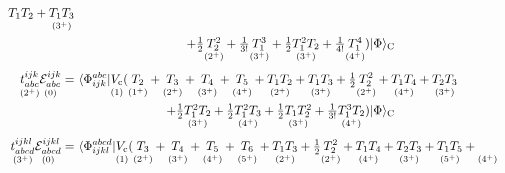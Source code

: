 \documentclass[11pt]{article}
\numberwithin{equation}{section}
\begin{document}
\begin{rmk}
\begin{align}
{      T_1T_2
    }
    +
    \underset{(3^{+})}{\vphantom{(}
      T_1T_3
    }
\\
\label{eq:cc-doubles-equation}
&
\makebox[0.75\linewidth][r]{\ensuremath{
    +
      \tfr{1}{2}
    \underset{(2^{+})}{\vphantom{(}
      T_2^2
    }
    +
      \tfr{1}{3!}
    \underset{(3^{+})}{\vphantom{(}
      T_1^3
    }
    +
      \tfr{1}{2}
    \underset{(3^{+})}{\vphantom{(}
      T_1^2T_2
    }
    +
      \tfr{1}{4!}
    \underset{(4^{+})}{\vphantom{(}
      T_1^4
    }
    )
  \kt{\F}_\mr{C}
}}
\\[3pt]
\nonumber
  \underset{(2^+)}{\vphantom{(}
  t_{abc}^{ijk}
  }
  \underset{(0)}{\vphantom{(}
  \mc{E}_{abc}^{ijk}
  }
=&\
  \br{\F_{ijk}^{abc}}
  \underset{(1)}{\vphantom{(}
    V_\mr{c}
  }
    (
    \underset{(1^{+})}{\vphantom{(}
      T_2
    }
    +
    \underset{(2^{+})}{\vphantom{(}
      T_3
    }
    +
    \underset{(3^{+})}{\vphantom{(}
      T_4
    }
    +
    \underset{(4^{+})}{\vphantom{(}
      T_5
    }
    +
    \underset{(2^{+})}{\vphantom{(}
      T_1T_2
    }
    +
    \underset{(3^{+})}{\vphantom{(}
      T_1T_3
    }
    +
      \tfr{1}{2}
    \underset{(2^{+})}{\vphantom{(}
      T_2^2
    }
    +
    \underset{(4^{+})}{\vphantom{(}
      T_1T_4
    }
    +
    \underset{(3^{+})}{\vphantom{(}
      T_2T_3
    }
\\
\label{eq:cc-triples-equation}
&
\makebox[0.75\linewidth][r]{\ensuremath{
    +
      \tfr{1}{2}
    \underset{(3^{+})}{\vphantom{(}
      T_1^2T_2
    }
    +
      \tfr{1}{2}
    \underset{(4^{+})}{\vphantom{(}
      T_1^2T_3
    }
    +
      \tfr{1}{2}
    \underset{(3^{+})}{\vphantom{(}
      T_1T_2^2
    }
    +
      \tfr{1}{3!}
    \underset{(4^{+})}{\vphantom{(}
      T_1^3T_2
    }
    )
  \kt{\F}_\mr{C}
}}
\\[3pt]
\nonumber
  \underset{(3^+)}{\vphantom{(}
  t_{abcd}^{ijkl}
  }
  \underset{(0)}{\vphantom{(}
  \mc{E}_{abcd}^{ijkl}
  }
=&\
  \br{\F_{ijkl}^{abcd}}
  \underset{(1)}{\vphantom{(}
    V_\mr{c}
  }
    (
    \underset{(2^{+})}{\vphantom{(}
      T_3
    }
    +
    \underset{(3^{+})}{\vphantom{(}
      T_4
    }
    +
    \underset{(4^{+})}{\vphantom{(}
      T_5
    }
    +
    \underset{(5^{+})}{\vphantom{(}
      T_6
    }
    +
    \underset{(2^{+})}{\vphantom{(}
      T_1T_3
    }
    +
      \tfr{1}{2}
    \underset{(2^{+})}{\vphantom{(}
      T_2^2
    }
    +
    \underset{(4^{+})}{\vphantom{(}
      T_1T_4
    }
    +
    \underset{(3^{+})}{\vphantom{(}
      T_2T_3
    }
    +
    \underset{(5^{+})}{\vphantom{(}
      T_1T_5
    }
    +
    \underset{(4^{+})}{\vphantom{(}
}
\end{align}
\end{rmk}
\end{document}
